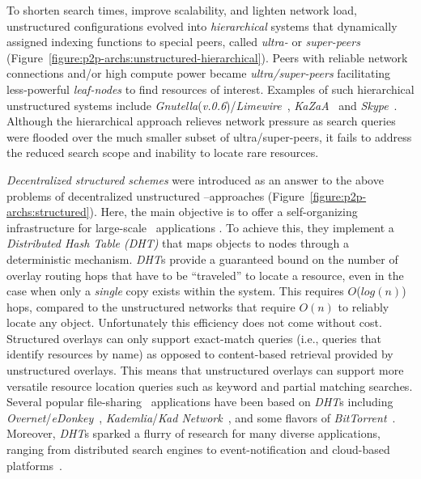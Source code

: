 
To shorten search times, improve scalability, and lighten network load, 
unstructured configurations evolved into \emph{hierarchical} systems 
that dynamically assigned indexing functions to special peers, 
called \emph{ultra-}  or \emph{super-peers} 
(Figure~\ref{figure:p2p-archs:unstructured-hierarchical}). 
Peers with reliable network connections and/or high compute power 
became \emph{ultra/super-peers}
facilitating less-powerful \emph{leaf-nodes} to find resources of
interest. 
Examples of such hierarchical unstructured systems include
\emph{Gnutella}(\emph{v.0.6})/\emph{Limewire}~\cite{gnutella}, 
\emph{KaZaA}~\cite{kazaa} and \emph{Skype}~\cite{skype}. 
Although the hierarchical approach relieves network pressure as
search queries were flooded over the much smaller subset of 
ultra/super-peers, it fails to address the reduced search scope and
inability to locate rare resources.

\emph{Decentralized structured schemes} were introduced as an answer to the above
problems of decentralized unstructured \p--approaches
(Figure~\ref{figure:p2p-archs:structured}).
Here, the main objective is to offer 
a self-organizing infrastructure for large-scale \p\ applications
\cite{ratnasamy_can_2001,stoica_chord_2001,antony_pastry_2001,zhao_tapestry_2001,maymounkov_kademlia_2002,rgrk_bamboo_2004}.
To achieve this, they implement a \emph{Distributed Hash Table (DHT)} that maps
objects to nodes through a deterministic mechanism. \emph{DHT}s provide a
guaranteed bound on the number of overlay routing hops that have to be
``traveled'' to locate a resource, even in the case when only a \emph{single}
copy exists within the system. This requires
$O$($log(n)$) hops, compared to the unstructured networks that require
$O(n)$ to reliably locate any object. Unfortunately this efficiency does not
come without cost. Structured overlays can only support exact-match queries 
(i.e., queries that identify resources by name) as opposed
to content-based retrieval provided by unstructured overlays. 
This means that unstructured overlays can support more versatile 
resource location queries such as keyword and partial matching searches. 
Several popular file-sharing \p\ applications have been based on \emph{DHT}s
including \emph{Overnet}/\emph{eDonkey}~\cite{overnet}, 
\emph{Kademlia}/\emph{Kad Network}~\cite{maymounkov_kademlia_2002},  and 
some flavors of \emph{BitTorrent}~\cite{c_bittorrent_2003}.  
Moreover, \emph{DHT}s sparked
a flurry of research for many diverse applications, ranging
from distributed search engines to event-notification and cloud-based
platforms~\cite{kbc_oceanstore_2000,rkcd_scribe_2001,mgpj_cloudsnap_2011}.

